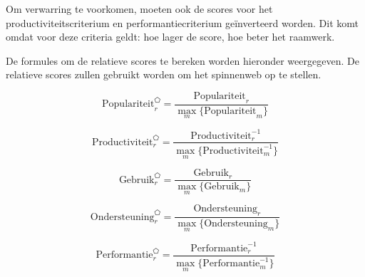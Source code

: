 Om verwarring te voorkomen, moeten ook de scores voor het productiviteitscriterium en performantiecriterium geïnverteerd worden.
Dit komt omdat voor deze criteria geldt:  hoe lager de score,  hoe beter het raamwerk.

De formules om de relatieve scores te bereken worden hieronder weergegeven.
De relatieve scores zullen gebruikt worden om het spinnenweb op te stellen.

\begin{equation}
  \text{Populariteit}_r^{\pentagon}=\frac{\text{Populariteit}_r}{\underset{m}{\max}\{\text{Populariteit}_m\}}
  \label{eq:rel-populariteit}
\end{equation}

\begin{equation}
  \text{Productiviteit}_r^{\pentagon} = \frac{\text{Productiviteit}_r^{-1}}{\underset{m}{\max}\{\text{Productiviteit}_m^{-1}\}}
  \label{eq:rel-productiviteit}
\end{equation}

\begin{equation}
  \text{Gebruik}_r^{\pentagon} = \frac{\text{Gebruik}_r}{\underset{m}{\max}\{\text{Gebruik}_m\}}
  \label{eq:rel-gebruik}
\end{equation}

\begin{equation}
  \text{Ondersteuning}_r^{\pentagon} = \frac{\text{Ondersteuning}_r}{\underset{m}{\max}\{\text{Ondersteuning}_m\}}
  \label{eq:rel-ondersteuning}
\end{equation}

\begin{equation}
  \text{Performantie}_r^{\pentagon}= \frac{\text{Performantie}_r^{-1}}{\underset{m}{\max}\{\text{Performantie}_m^{-1}\}}
  \label{eq:rel-performantie}
\end{equation}
